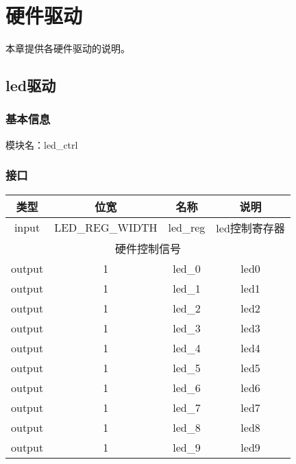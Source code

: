 %
% 
% 
% 
% 
% 
% 
%

\chapter{硬件驱动}
本章提供各硬件驱动的说明。
\section{led驱动}
\subsection{基本信息}
模块名：led\_ctrl
\subsection{接口}
\begin{tabular}{|c|c|c|c|}
    \hline
    类型    &   位宽    &   名称    &   说明\\\hline
    input   &   LED\_REG\_WIDTH   &   led\_reg &   led控制寄存器\\\hline
    \multicolumn{4}{|c|}{硬件控制信号}\\\hline
    output   &   1   &   led\_0  &   led0\\\hline
    output   &   1   &   led\_1  &   led1\\\hline
    output   &   1   &   led\_2  &   led2\\\hline
    output   &   1   &   led\_3  &   led3\\\hline
    output   &   1   &   led\_4  &   led4\\\hline
    output   &   1   &   led\_5  &   led5\\\hline
    output   &   1   &   led\_6  &   led6\\\hline
    output   &   1   &   led\_7  &   led7\\\hline
    output   &   1   &   led\_8  &   led8\\\hline
    output   &   1   &   led\_9  &   led9\\\hline
\end{tabular}
